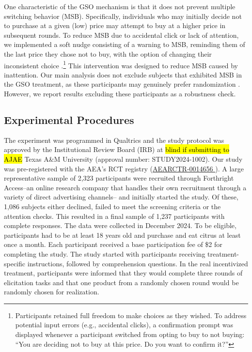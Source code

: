 \documentclass[12pt]{article}
\begin{document}
One characteristic of the GSO mechanism is that it does not prevent multiple switching behavior (MSB). Specifically, individuals who may initially decide not to purchase at a given (low) price may attempt to buy at a higher price in subsequent rounds. To reduce MSB due to accidental click or lack of attention, we implemented a soft nudge consisting of a warning to MSB, reminding them of the last price they chose not to buy, with the option of changing their inconsistent choice \citep{yu2021multiple}.\footnote{Participants retained full freedom to make choices as they wished. To address potential input errors (e.g., accidental clicks), a confirmation prompt was displayed whenever a participant switched from opting to buy to not buying: ``You are deciding not to buy at this price. Do you want to confirm it?''} 
This intervention was designed to reduce MSB caused by inattention. Our main analysis does not exclude subjects that exhibited MSB in the GSO treatment, as these participants may genuinely prefer randomization \citep{agranov2017stochastic}. However, we report results excluding these participants as a robustness check.
    
\subsection{Experimental Procedures}
The experiment was programmed in Qualtrics and the study protocol was approved by the Institutional Review Board (IRB) at \hl{blind if submitting to AJAE} Texas A\&M University (approval number: STUDY2024-1002). Our study was pre-registered with the AEA's RCT registry (\href{https://www.socialscienceregistry.org/trials/14656}{AEARCTR-0014656
}). A large representative sample of 2,323 participants were recruited through Forthright Access--an online research company that handles their own recruitment through a variety of direct advertising channels-- and initially started the study. Of these, 1,086 subjects either declined, failed to meet the screening criteria or the attention checks. This resulted in a final sample of 1,237 participants with complete responses. The data were collected in December 2024. To be eligible, participants had to be at least 18 years old and purchase and eat citrus at least once a month. 
Each participant received a base participation fee of \$2 for completing the study. The study started with participants receiving treatment-specific instructions, followed by comprehension questions. In the real incentivized treatment, participants were informed that they would complete three rounds of elicitation tasks and that one product from a randomly chosen round would be randomly chosen for realization. 
\end{document}
